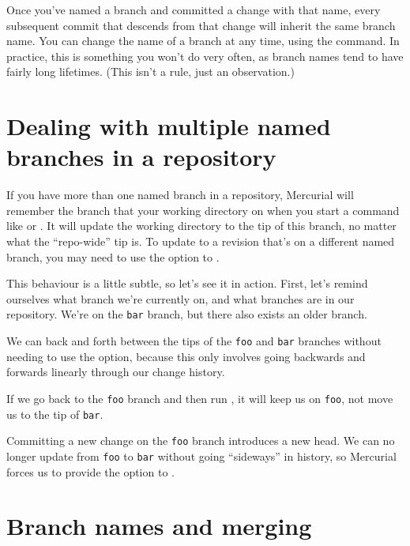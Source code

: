 Once you've named a branch and committed a change with that name,
every subsequent commit that descends from that change will inherit
the same branch name.  You can change the name of a branch at any
time, using the  command.  
In practice, this is something you won't do very often, as branch
names tend to have fairly long lifetimes.  (This isn't a rule, just an
observation.)

\section{Dealing with multiple named branches in a repository}

If you have more than one named branch in a repository, Mercurial will
remember the branch that your working directory on when you start a
command like  or .  It will update
the working directory to the tip of this branch, no matter what the
``repo-wide'' tip is.  To update to a revision that's on a different
named branch, you may need to use the  option to
.

This behaviour is a little subtle, so let's see it in action.  First,
let's remind ourselves what branch we're currently on, and what
branches are in our repository.
We're on the \texttt{bar} branch, but there also exists an older
 branch.

We can  back and forth between the tips of the
\texttt{foo} and \texttt{bar} branches without needing to use the
 option, because this only involves going backwards
and forwards linearly through our change history.

If we go back to the \texttt{foo} branch and then run ,
it will keep us on \texttt{foo}, not move us to the tip of
\texttt{bar}.

Committing a new change on the \texttt{foo} branch introduces a new
head.
We can no longer update from \texttt{foo} to \texttt{bar} without
going ``sideways'' in history, so Mercurial forces us to provide the
 option to .

\section{Branch names and merging}

